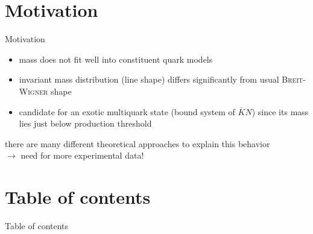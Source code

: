 \documentclass[11pt,aspectratio=1610,dvipsnames]{beamer}
\begin{document}
\section*{Motivation}
\begin{frame}{Motivation}
\begin{minipage}{\linewidth}
		\begin{tcolorbox}[colback=black!10,colframe=gray!20!black,title=What is special about the $\Lambda(1405)$?] 
			\begin{itemize}
				\item mass does not fit well into constituent quark models 
				\item invariant mass distribution (line shape) differs significantly from usual \textsc{Breit-Wigner} shape
				\item candidate for an exotic multiquark state (bound system of $\overline{K}N$) since its mass lies just below production threshold
			
 			\end{itemize}
 		\vspace{.5cm}
 		there are  many different theoretical approaches to explain this behavior\\
 		$\to$ need for more experimental data!
		\end{tcolorbox}

\end{minipage}




	
\end{frame}
\section*{Table of contents}
\begin{frame}{Table of contents}
	\tableofcontents
\end{frame}
\end{document}
